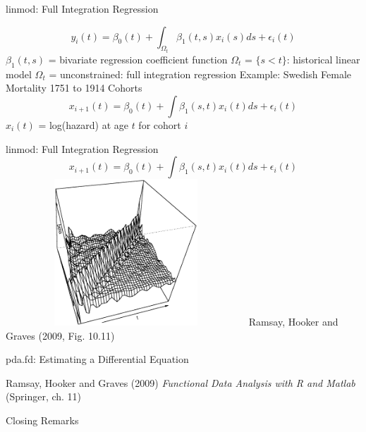 \documentclass[compress]{beamer}
\begin{document}

\begin{frame}{linmod:  Full Integration Regression}

\[
y_i(t) = \beta_0(t) + \int_{\Omega_t} \beta_1(t,s) x_i(s) d s + \epsilon_i(t)
\]
$\beta_1(t,s)$ = bivariate regression coefficient function
$\Omega_t$ = $\{s < t\}$:  historical linear model
$\Omega_t$ = unconstrained:  full integration regression
\newline \newline
Example:  \newline
Swedish Female Mortality 1751 to 1914 Cohorts \newline
\[
x_{i+1}(t) = \beta_0(t) + \int \beta_1(s,t) x_i(t) d s + \epsilon_i(t)
\]
$x_i(t)$ = log(hazard) at age $t$ for cohort $i$ \newline
\end{frame}


\begin{frame}{linmod:  Full Integration Regression}
\[
x_{i+1}(t) = \beta_0(t) + \int \beta_1(s,t) x_i(t) d s + \epsilon_i(t)
\]
\includegraphics[height=5.5cm, width=9cm]{figs/swede_beta1}
\newline
Ramsay, Hooker and Graves (2009, Fig. 10.11)

\end{frame}

\begin{frame}{pda.fd:  Estimating a Differential Equation}

Ramsay, Hooker and Graves (2009)
\emph{Functional Data Analysis with R and Matlab}
(Springer, ch. 11)

\end{frame}
\begin{frame}{Closing Remarks}

\end{frame}
\end{document}
